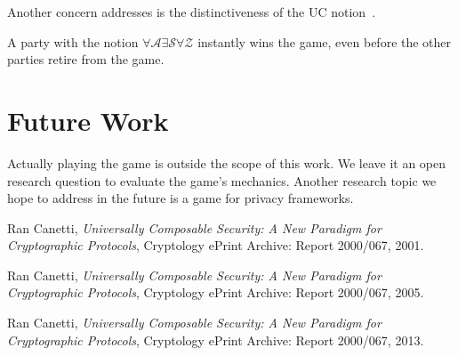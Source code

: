 \documentclass{llncs}
\begin{document}
Another concern \ucftw addresses is the distinctiveness of the UC notion~\cite{can01,can05,can13}.

\begin{theorem}
	A party with the notion $\forall\mathcal{A}\exists\mathcal{S}\forall\mathcal{Z}$ instantly wins the game, even before the other parties retire from the game.
\end{theorem}

\section{Future Work}
Actually playing the game is outside the scope of this work.
We leave it an open research question to evaluate the game's mechanics.
Another research topic we hope to address in the future is a game for privacy frameworks.

\begin{thebibliography}{9}
  Ran Canetti,
  \emph{Universally Composable Security: A New Paradigm for Cryptographic Protocols},
  Cryptology ePrint Archive: Report 2000/067,
  2001.

  Ran Canetti,
  \emph{Universally Composable Security: A New Paradigm for Cryptographic Protocols},
  Cryptology ePrint Archive: Report 2000/067,
  2005.

  Ran Canetti,
  \emph{Universally Composable Security: A New Paradigm for Cryptographic Protocols},
  Cryptology ePrint Archive: Report 2000/067,
  2013.
\end{thebibliography}
\end{document}
